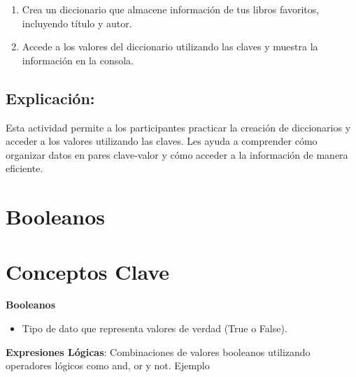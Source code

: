 \documentclass[
  a4paper,
  DIV=11,
  numbers=noendperiod,
  onepage,
  openany]{scrreprt}
\providecommand{\tightlist}{%
  \setlength{\itemsep}{0pt}\setlength{\parskip}{0pt}}\usepackage{longtable,booktabs,array}
\begin{document}
\begin{tcolorbox}[enhanced jigsaw, toptitle=1mm, toprule=.15mm, title=\textcolor{quarto-callout-tip-color}{\faLightbulb}\hspace{0.5em}{Actividad Práctica}, colbacktitle=quarto-callout-tip-color!10!white, opacitybacktitle=0.6, titlerule=0mm, colback=white, left=2mm, bottomrule=.15mm, breakable, bottomtitle=1mm, rightrule=.15mm, colframe=quarto-callout-tip-color-frame, arc=.35mm, leftrule=.75mm, coltitle=black, opacityback=0]

\begin{enumerate}
\def\labelenumi{\arabic{enumi}.}
\tightlist
\item
  Crea un diccionario que almacene información de tus libros favoritos,
  incluyendo título y autor.
\item
  Accede a los valores del diccionario utilizando las claves y muestra
  la información en la consola.
\end{enumerate}

\end{tcolorbox}

\subsection{Explicación:}\label{explicaciuxf3n-11}

Esta actividad permite a los participantes practicar la creación de
diccionarios y acceder a los valores utilizando las claves. Les ayuda a
comprender cómo organizar datos en pares clave-valor y cómo acceder a la
información de manera eficiente.

\section{Booleanos}\label{booleanos}

\section{Conceptos Clave}\label{conceptos-clave-10}

\textbf{Booleanos}

\begin{itemize}
\tightlist
\item
  Tipo de dato que representa valores de verdad (True o False).
\end{itemize}

\textbf{Expresiones Lógicas}: Combinaciones de valores booleanos
utilizando operadores lógicos como and, or y not. Ejemplo
\end{document}
